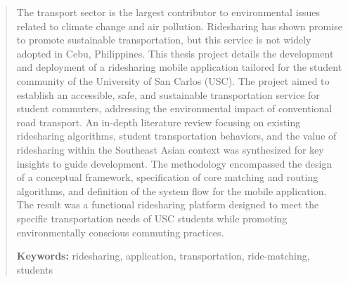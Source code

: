 \begin{abstract}
The transport sector is the largest contributor to environmental issues related to climate change and air pollution. Ridesharing has shown promise to promote sustainable transportation, but this service is not widely adopted in Cebu, Philippines. This thesis project details the development and deployment of a ridesharing mobile application tailored for the student community of the University of San Carlos (USC). The project aimed to establish an accessible, safe, and sustainable transportation service for student commuters, addressing the environmental impact of conventional road transport. An in-depth literature review focusing on existing ridesharing algorithms, student transportation behaviors, and the value of ridesharing within the Southeast Asian context was synthesized for key insights to guide development. The methodology encompassed the design of a conceptual framework, specification of core matching and routing algorithms, and definition of the system flow for the mobile application. The result was a functional ridesharing platform designed to meet the specific transportation needs of USC students while promoting environmentally conscious commuting practices.

\medskip
\noindent\textbf{Keywords:} ridesharing, application, transportation, ride-matching, students
\end{abstract}
